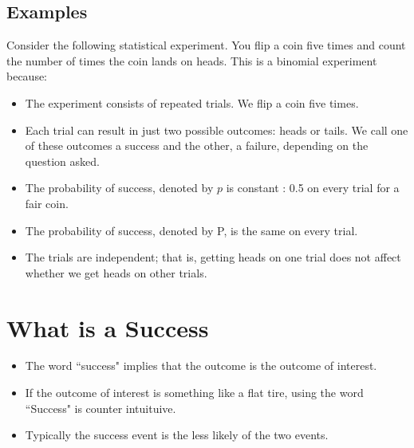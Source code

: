 \subsection*{Examples}
Consider the following statistical experiment. You flip a coin five times and count the number of times the coin lands on heads. This is a binomial experiment because:
\begin{itemize}
\item The experiment consists of repeated trials. We flip a coin five times.
\item Each trial can result in just two possible outcomes: heads or tails. We call one of these outcomes a success and the other, a failure, depending on the question asked.

\item The probability of success, denoted by $p$ is constant : 0.5 on every trial for a fair coin.
\item The probability of success, denoted by P, is the same on every trial.
\item The trials are independent; that is, getting heads on one trial does not affect whether we get heads on other trials.
\end{itemize}




\section*{What is a Success}
\begin{itemize}
\item
The word ``success" implies that the outcome is the outcome of interest.
\item If the outcome of interest is something like a flat tire, using the word ``Success" is counter intuituive.
\item Typically the success event is the less likely of the two events.
\end{itemize}

